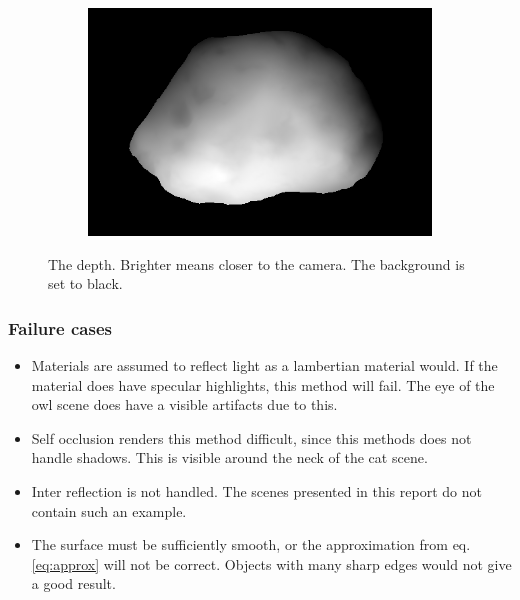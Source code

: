 \documentclass{paper}
\begin{document}
\begin{figure}[h!]
\begin{subfigure}{0.3\textwidth}
        \end{subfigure}
        ~ 
        \begin{subfigure}{0.3\textwidth}
                \includegraphics[width=\textwidth]{report_fig/rock_d}
        \end{subfigure}
        \caption{The depth. Brighter means closer to the camera.
        The background is set to black.}
        \label{fig:depth}
\end{figure}

\subsubsection{Failure cases}
\begin{itemize}
\item Materials are assumed to reflect light as a lambertian material would. 
If the material does have specular highlights, this method will fail. The eye of the owl
scene does have a visible artifacts due to this.

\item Self occlusion renders
this method difficult, since this methods does not handle shadows. This is visible around
the neck of the cat scene.

\item Inter reflection is not handled. The scenes presented in this report
do not contain such an example.

\item The surface must be sufficiently smooth, or the approximation from eq. \ref{eq:approx} will not be correct.
Objects with many sharp edges would not give a good result.
\end{itemize}
\end{document}
